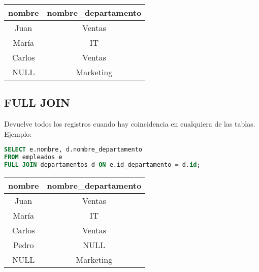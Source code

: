 \documentclass[12pt]{article}
\begin{document}
\begin{center}
\begin{tabular}{cc}
\toprule
nombre & nombre\_departamento \\
\midrule
Juan & Ventas \\
María & IT \\
Carlos & Ventas \\
NULL & Marketing \\
\bottomrule
\end{tabular}
\end{center}

\subsection{FULL JOIN}
Devuelve todos los registros cuando hay coincidencia en cualquiera de las tablas. Ejemplo:
\begin{lstlisting}[language=SQL]
SELECT e.nombre, d.nombre_departamento
FROM empleados e
FULL JOIN departamentos d ON e.id_departamento = d.id;
\end{lstlisting}

\begin{center}
\begin{tabular}{cc}
\toprule
nombre & nombre\_departamento \\
\midrule
Juan & Ventas \\
María & IT \\
Carlos & Ventas \\
Pedro & NULL \\
NULL & Marketing \\
\bottomrule
\end{tabular}
\end{center}
\end{document}
